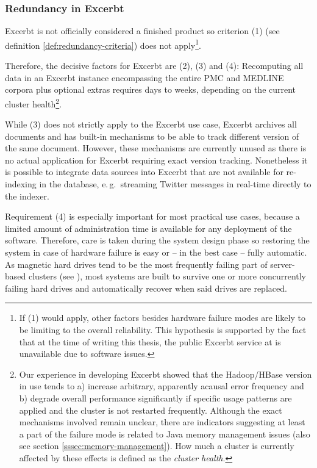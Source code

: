 \documentclass[a4paper, 12pt, twoside, reqn]{report}
\numberwithin{figure}{chapter}
\newtheorem[L]{boxedDefinition}{Definition}
\newtheorem[L]{boxedExample}{Example}
\newcommand{\eg}{e.\,g.\ }
\begin{document}
\subsubsection{Redundancy in Excerbt}\label{ssec:redundancy-excerbt}
Excerbt is not officially considered a finished product so criterion (1) (see definition \ref{def:redundancy-criteria}) does not apply\footnote{If (1) would apply, other factors besides hardware failure modes are likely to be limiting to the overall reliability. This hypothesis is supported by the fact that at the time of writing this thesis, the public Excerbt service at \cite{excerbt} is unavailable due to software issues.}.

Therefore, the decisive factors for Excerbt are (2), (3) and (4): Recomputing all data in an Excerbt instance encompassing the entire PMC and MEDLINE corpora plus optional extras requires days to weeks, depending on the current cluster health\footnote{Our experience in developing Excerbt showed that the Hadoop/HBase version in use tends to a) increase arbitrary, apparently acausal error frequency and b) degrade overall performance significantly if specific usage patterns are applied and the cluster is not restarted frequently. Although the exact mechanisms involved remain unclear, there are indicators suggesting at least a part of the failure mode is related to Java memory management issues (also see section \ref{sssec:memory-management}). How much a cluster is currently affected by these effects is defined as the \textit{cluster health}.}.

While (3) does not strictly apply to the Excerbt use case, Excerbt archives all documents and has built-in mechanisms to be able to track different version of the same document. However, these mechanisms are currently unused as there is no actual application for Excerbt requiring exact version tracking. Nonetheless it is possible to integrate data sources into Excerbt that are not available for re-indexing in the database, \eg streaming Twitter messages in real-time directly to the indexer.

Requirement (4) is especially important for most practical use cases, because a limited amount of administration time is available for any deployment of the software. Therefore, care is taken during the system design phase so restoring the system in case of hardware failure is easy or -- in the best case -- fully automatic. As magnetic hard drives tend to be the most frequently failing part of server-based clusters (see \cite{pinheiro2007failure}), most systems are built to survive one or more concurrently failing hard drives and automatically recover when said drives are replaced.
\end{document}
